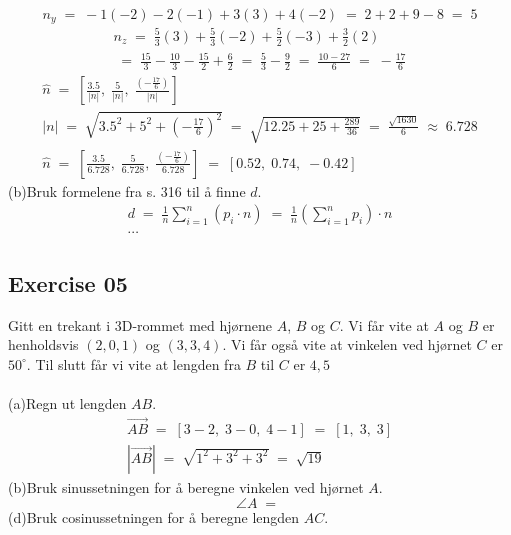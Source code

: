 \documentclass[12pt, a4paper]{article}
\begin{document}
			\begin{equation}
				\tag*{}
					n_y\;=\;-1(-2)-2(-1)+3(3)+4(-2)\;=\;
					2+2+9-8\;=\;5
			\end{equation}
			\begin{gather}
				\tag*{}
					n_z\;=\;\frac{5}{3}(3)+\frac{5}{3}(-2)
					+\frac{5}{2}(-3)+\frac{3}{2}(2)\\
				\tag*{}
					\;=\;\frac{15}{3}-\frac{10}{3}
					-\frac{15}{2}+\frac{6}{2}\;=\;
					\frac{5}{3}-\frac{9}{2}\;=\;
					\frac{10-27}{6}\;=\;-\frac{17}{6}
			\end{gather}
			\begin{gather}
				\tag*{}
					\hat{n}\;=\;\left[
						\frac{3.5}{|n|},\;
						\frac{5}{|n|},\;
						\frac{\left(-\frac{17}{6}\right)}{|n|}
					\right]\\
				\tag*{}
					|n|\;=\;\sqrt{
						3.5^2+5^2+\left(-\frac{17}{6}\right)^2
					}\;=\;\sqrt{12.25+25+\frac{289}{36}}
					\;=\;\frac{\sqrt{1630}}{6}
					\;\approx\;6.728\\
				\tag*{}
					\hat{n}\;=\;\left[
							\frac{3.5}{6.728},\;
							\frac{5}{6.728},\;
							\frac{\left(-\frac{17}{6}\right)}
							{6.728}					
					\right]\;=\;\left[
						0.52,\;0.74,\;-0.42
					\right]
			\end{gather}
\newpage
	\begin{equation}
		\tag*{}
	\end{equation}
	(b)\quad Bruk formelene fra s. 316 til å finne $d$.
			\begin{gather}
				\tag*{}
					d\;=\;\frac{1}{n}\sum_{i=1}^{n}\left(
						p_i \cdot n
					\right)\;=\;\frac{1}{n}\left(
						\sum_{i=1}^{n}p_i
					\right)\cdot n\\
				\tag*{}
					\cdots
			\end{gather}
\subsection*{Exercise 05}
Gitt en trekant i 3D-rommet med hjørnene
$A$, $B$ og $C$. Vi får vite at $A$ og $B$ er henholdsvis $(2, 0, 1)$ og $(3, 3, 4)$. Vi får også
vite at vinkelen ved hjørnet $C$ er $50^\circ$. Til slutt får vi vite at lengden fra $B$ til $C$ er 
$4,5$\\\\
	(a)\quad Regn ut lengden $AB$.
			\begin{gather}
				\tag*{}
					\vec{AB}\;=\;[
						3-2,\;3-0,\;4-1
					]\;=\;[1,\;3,\;3]\\
				\tag*{}
					\left|\vec{AB}\right|\;=\;
					\sqrt{1^2+3^2+3^2}\;=\;\sqrt{19}
			\end{gather}
	(b)\quad Bruk sinussetningen for å beregne vinkelen
	ved hjørnet $A$.
			\begin{equation}
				\tag*{}
					\angle A\;=\;
			\end{equation}
	(d)\quad Bruk cosinussetningen for å beregne lengden $AC$.
			\begin{equation}
				\tag*{}
			\end{equation}
\end{document}
